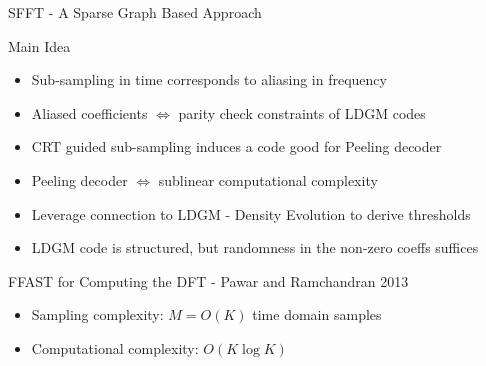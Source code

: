 \documentclass[10pt,xcolor=table]{beamer}
\begin{document}
	\begin{frame}{SFFT - A Sparse Graph Based Approach }
		
		\begin{block}{Main Idea}
			\begin{itemize}
				\item \alert{Sub-sampling} in time corresponds to \alert{aliasing} in frequency
	
				\item Aliased coefficients $\Leftrightarrow$ parity check constraints of \alert{LDGM codes}
				\item \alert{CRT} guided sub-sampling induces a code good for \alert{Peeling decoder}
				\item Peeling decoder $\Leftrightarrow$ \alert{sublinear} computational complexity
				\item Leverage connection to LDGM - Density Evolution to derive thresholds
				\item LDGM code is structured, but randomness in the non-zero coeffs suffices
			\end{itemize}
		\end{block}
		
		\pause
		
		\begin{block}{FFAST for Computing the DFT - Pawar and Ramchandran 2013}
			\begin{itemize}
				\item \alert{{Sampling complexity:}} $M = O(K)$ time domain samples
				\item \alert{{Computational complexity:}} $O(K \log{K})$
			\end{itemize}
		\end{block}
		
		
		
	\end{frame}
\end{document}
